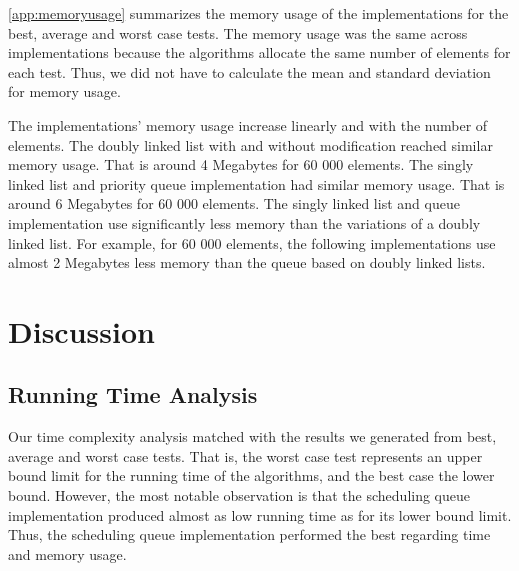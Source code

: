 \documentclass[a4paper,11pt]{kth-mag}
\newcommand*{\skippara}{\par\vspace{\baselineskip} \noindent}
\begin{document}
\cref{app:memoryusage} summarizes the memory usage of the implementations for the best, average and worst case tests.
The memory usage was the same across implementations because the algorithms allocate the same number of elements for each test.
Thus, we did not have to calculate the mean and standard deviation for memory usage.

\skippara The implementations' memory usage increase linearly and with the number of elements.
The doubly linked list with and without modification reached similar memory usage.
That is around 4 Megabytes for 60 000 elements.
The singly linked list and priority queue implementation had similar memory usage.
That is around 6 Megabytes for 60 000 elements.
The singly linked list and queue implementation use significantly less memory than the variations of a doubly linked list.
For example, for 60 000 elements, the following implementations use almost 2 Megabytes less memory than the queue based on doubly linked lists.

\section{Discussion}

\subsection{Running Time Analysis}\label{sec:rtanal}
Our time complexity analysis matched with the results we generated from best, average and worst case tests.
That is, the worst case test represents an upper bound limit for the running time of the algorithms, and the best case the lower bound.
However, the most notable observation is that the scheduling queue implementation produced almost as low running time as for its lower bound limit.
Thus, the scheduling queue implementation performed the best regarding time and memory usage.
\end{document}
